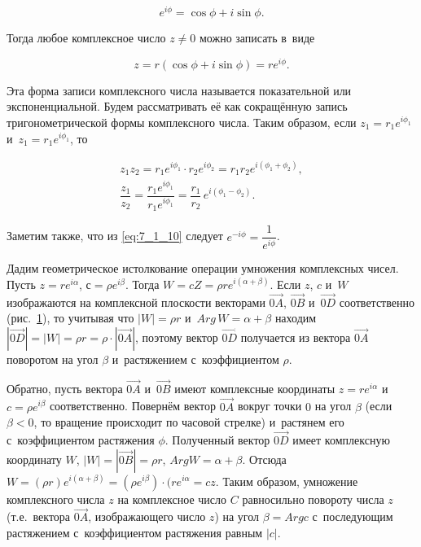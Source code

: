 \begin{equation}\label{eq:7_1_7}
e^{i\phi} = \cos \phi + i \sin \phi.
\end{equation}

\noindent
Тогда любое комплексное число $z \ne 0$ можно записать в~виде

\begin{equation}\label{eq:7_1_8}
z = r ( \cos \phi + i \sin \phi ) = r e^{i\phi}.
\end{equation}

\noindent
Эта форма записи комплексного числа называется показательной или экспоненциальной.
Будем рассматривать её как сокращённую запись тригонометрической формы комплексного числа.
Таким образом, если $z_{1} = r_{1}e^{i\phi_{1}}$ и~$z_{1} = r_{1}e^{i\phi_{1}}$, то 

\begin{gather}
z_{1}z_{2} = r_{1}e^{i\phi_{1}} \cdot r_{2}e^{i\phi_{2}} =
    r_{1}r_{2}e^{i(\phi_{1} + \phi_{2})}, \label{eq:7_1_9} \\
\dfrac{z_{1}}{z_{2}} = \dfrac{r_{1}e^{i\phi_{1}}}{r_{1}e^{i\phi_{1}}} =
    \dfrac{r_{1}}{r_{2}} \, e^{i(\phi_{1} - \phi_{2})}. \label{eq:7_1_10} 
\end{gather}

\noindent
Заметим также, что из \eqref{eq:7_1_10} следует $e^{-i\phi} = \dfrac{1}{e^{i\phi}}$.

Дадим геометрическое истолкование операции умножения комплексных чисел.
Пусть $z = r e^{i\alpha}$, $с = \rho e^{i\beta}$.
Тогда $W = cZ = \rho r e^{i(\alpha + \beta)}$.
Если $z$, $c$ и~$W$ изображаются на комплексной плоскости векторами 
$\overrightarrow{0A}$, $\overrightarrow{0B}$ и~$\overrightarrow{0D}$ соответственно
(рис.\ \ref{fig:7_1_6}), то учитывая что $|W| = \rho r$ и~$Arg \, W = \alpha + \beta$
находим $|\overrightarrow{0D}| = |W| = \rho r = \rho \cdot |\overrightarrow{0A}|$,
поэтому вектор $\overrightarrow{0D}$ получается из вектора $\overrightarrow{0A}$ 
поворотом на угол $\beta$ и~растяжением с~коэффициентом $\rho$.

\begin{figure}\label{fig:7_1_6}
\end{figure}

\noindent
Обратно, пусть вектора $\overrightarrow{0A}$ и~$\overrightarrow{0B}$ имеют
комплексные координаты $z = r e^{i\alpha}$ и~$c = \rho e^{i\beta}$ соответственно.
Повернём вектор $\overrightarrow{0A}$ вокруг точки $0$ на угол $\beta$
(если $\beta < 0$, то вращение происходит по часовой стрелке)
и~растянем его с~коэффициентом растяжения $\phi$. Полученный вектор $\overrightarrow{0D}$ 
имеет комплексную координату $W$, $|W| = |\overrightarrow{0B}| = \rho r$,
$Arg W = \alpha + \beta$. 
Отсюда $W = (\rho r)e^{i(\alpha + \beta)} = (\rho e^{i\beta}) \cdot (r e^{i\alpha} = cz$.
Таким образом, умножение комплексного числа $z$ на комплексное число $C$ равносильно
повороту числа $z$ (т.е.\ вектора $\overrightarrow{0A}$, изображающего число $z$)
на угол $\beta = Arg c$ с~последующим растяжением с~коэффициентом растяжения равным
$|c|$.

